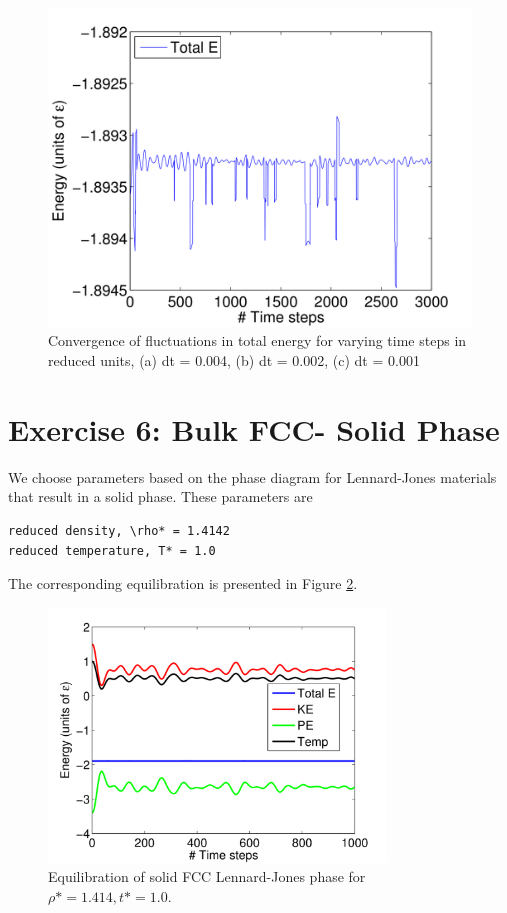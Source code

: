 \documentclass[12pt, oneside]{article}
\begin{document}
\begin{figure}
\begin{minipage}[!htbp]{.5\linewidth}
\includegraphics[width=\textwidth]{./figs/ex5-dt=001.png}
\subcaption{}
\end{minipage}
\caption{Convergence of fluctuations in total energy for varying time steps in reduced units, (a) dt = 0.004, (b) dt = 0.002, (c) dt = 0.001}
\label{fig:fccdt}
\end{figure}

\section{Exercise 6: Bulk FCC- Solid Phase}

We choose parameters based on the phase diagram for Lennard-Jones materials that result in a solid phase. 
These parameters are 

\begin{verbatim}
reduced density, \rho* = 1.4142
reduced temperature, T* = 1.0
\end{verbatim}

The corresponding equilibration is presented in Figure \ref{fig:fccsolideq}. 

\begin{figure}[htbp]
   \centering
   \includegraphics[width=0.8\textwidth]{./figs/ex6-etk.png} %
   \caption{Equilibration of solid FCC Lennard-Jones phase for $\rho* = 1.414, t* = 1.0$.}
   \label{fig:fccsolideq}
\end{figure}
\end{document}
